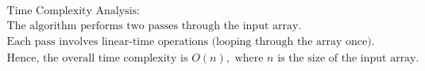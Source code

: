 \documentclass[preview]{standalone}
\begin{document}
\begin{align*}
\text{Time Complexity Analysis:} \\ \text{The algorithm performs two passes through the input array.} \\ \text{Each pass involves linear-time operations (looping through the array once).} \\ \text{Hence, the overall time complexity is } O(n), \text{ where } n \text{ is the size of the input array.}
\end{align*}
\end{document}
